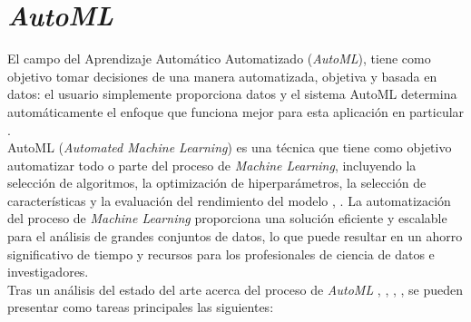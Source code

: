          
\section{\textit{AutoML}}
El campo del Aprendizaje Automático Automatizado (\textit{AutoML}), tiene como objetivo tomar decisiones de una manera automatizada, objetiva y basada en datos: el usuario simplemente proporciona datos y el sistema AutoML determina automáticamente el enfoque que funciona mejor para esta aplicación en particular \citep{hutter2019automated}. \\
AutoML (\textit{Automated Machine Learning}) es una técnica que tiene como objetivo automatizar todo o parte del proceso de \textit{Machine Learning}, incluyendo la selección de algoritmos, la optimización de hiperparámetros, la selección de características y la evaluación del rendimiento del modelo \citep{he2021automl}, \citep{tuggener2019automated}. La automatización del proceso de \textit{Machine Learning} proporciona una solución eficiente y escalable para el análisis de grandes conjuntos de datos, lo que puede resultar en un ahorro significativo de tiempo y recursos para los profesionales de ciencia de datos e investigadores. \\ 
Tras un análisis del estado del arte acerca del proceso de \textit{AutoML} \citep{tuggener2019automated}, \citep{waring2020automated}, \citep{hutter2019automated}, \citep{he2021automl}, se pueden presentar como tareas principales las siguientes:
